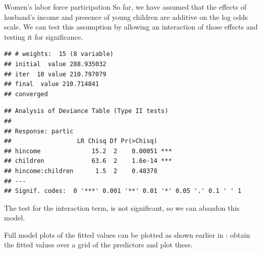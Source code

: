 \documentclass[11pt]{book}
\renewenvironment{knitrout}{\small\renewcommand{\baselinestretch}{.85}}{} %
\begin{document}
\begin{Example}[wlfpart2]{Women's labor force participation}
So far, we have assumed that the effects of husband's income and presence of young children
are additive on the log odds scale.  We can test this assumption by allowing an
interaction of those effects and testing it for significance.  
\begin{knitrout}
\color{fgcolor}\begin{kframe}
\begin{alltt}
 \hlkwb{<-}  \hlopt{~}  \hlopt{*} 
                          \hlstd{=}\hlstd{)}
\end{alltt}
\begin{verbatim}
## # weights:  15 (8 variable)
## initial  value 288.935032 
## iter  10 value 210.797079
## final  value 210.714841 
## converged
\end{verbatim}
\begin{alltt}
\end{alltt}
\begin{verbatim}
## Analysis of Deviance Table (Type II tests)
## 
## Response: partic
##                  LR Chisq Df Pr(>Chisq)    
## hincome              15.2  2    0.00051 ***
## children             63.6  2    1.6e-14 ***
## hincome:children      1.5  2    0.48378    
## ---
## Signif. codes:  0 '***' 0.001 '**' 0.01 '*' 0.05 '.' 0.1 ' ' 1
\end{verbatim}
\end{kframe}
\end{knitrout}
\noindent The test for the interaction term,  is not significant,
so we can abandon this model.

Full model plots of the fitted values can be plotted as shown earlier in
: obtain the fitted values over a grid of the
predictors and plot these.


\end{Example}
\end{document}
